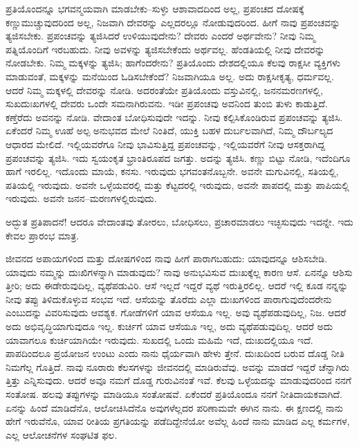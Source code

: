 ಪ್ರತಿಯೊಂದನ್ನೂ ಭಗವನ್ಮಯವಾಗಿ ಮಾಡಬೇಕು–ಸುಳ್ಳು ಆಶಾವಾದದಿಂದ ಅಲ್ಲ, ಪ್ರಪಂಚದ ದೋಷಕ್ಕೆ ಕಣ್ಣುಮುಚ್ಚುವುದರಿಂದ ಅಲ್ಲ, ನಿಜವಾಗಿ ದೇವರನ್ನು ಎಲ್ಲದರಲ್ಲೂ ನೋಡುವುದರಿಂದ. ಹೀಗೆ ನಾವು ಪ್ರಪಂಚವನ್ನು ತ್ಯಜಿಸಬೇಕು. ಪ್ರಪಂಚವನ್ನು ತ್ಯಜಿಸಿದರೆ ಉಳಿಯುವುದೇನು? ದೇವರು ಎಂದರೆ ಅರ್ಥವೇನು? ನೀವು ನಿಮ್ಮ ಪತ್ನಿಯೊಂದಿಗೆ ಇರಬಹುದು. ನೀವು ಅವಳನ್ನು ತ್ಯಜಿಸಬೇಕೆಂದು ಅರ್ಥವಲ್ಲ. ಹೆಂಡತಿಯಲ್ಲಿ ನೀವು ದೇವರನ್ನು ನೋಡಬೇಕು. ನಿಮ್ಮ ಮಕ್ಕಳನ್ನು ತ್ಯಜಿಸಿ; ಹಾಗೆಂದರೇನು? ಪ್ರತಿಯೊಂದು ದೇಶದಲ್ಲಿಯೂ ಕೆಲವು ರಾಕ್ಷಸೀ ವ್ಯಕ್ತಿಗಳು ಮಾಡುವಂತೆ, ಮಕ್ಕಳನ್ನು ಮನೆಯಿಂದ ಓಡಿಸಬೇಕೆಂದೆ? ನಿಜವಾಗಿಯೂ ಅಲ್ಲ. ಅದು ರಾಕ್ಷಸೀಕೃತ್ಯ, ಧರ್ಮವಲ್ಲ. ಆದರೆ ನಿಮ್ಮ ಮಕ್ಕಳಲ್ಲಿ ದೇವರನ್ನು ನೋಡಿ. ಅದರಂತೆಯೇ ಪ್ರತಿಯೊಂದು ವಸ್ತುವಿನಲ್ಲಿ, ಜನನಮರಣಗಳಲ್ಲಿ, ಸುಖದುಃಖಗಳಲ್ಲಿ ದೇವರು ಒಂದೇ ಸಮನಾಗಿರುವನು. ಇಡೀ ಪ್ರಪಂಚವು ಅವನಿಂದ ತುಂಬಿ ತುಳು ಕಾಡುತ್ತಿದೆ. ಕಣ್ತೆರೆದು ಅವನನ್ನು ನೋಡಿ. ವೇದಾಂತ ಬೋಧಿಸುವುದೇ ಇದನ್ನು. ನೀವು ಕಲ್ಪಿಸಿಕೊಂಡಿರುವ ಪ್ರಪಂಚವನ್ನು ತ್ಯಜಿಸಿ. ಏಕೆಂದರೆ ನಿಮ್ಮ ಊಹೆ ಅಲ್ಪ ಅನುಭವದ ಮೇಲೆ ನಿಂತಿದೆ, ಯುಕ್ತಿ ಬಹಳ ದುರ್ಬಲವಾಗಿದೆ, ನಿಮ್ಮ ದೌರ್ಬಲ್ಯದ ಆಧಾರದ ಮೇಲಿದೆ. ಇಲ್ಲಿಯವರೆಗೂ ನೀವು ಭಾವಿಸುತ್ತಿದ್ದ ಪ್ರಪಂಚವನ್ನು, ಇಲ್ಲಿಯವರೆಗೆ ನೀವು ಆಸಕ್ತರಾಗಿದ್ದ ಪ್ರಪಂಚವನ್ನು ತ್ಯಜಿಸಿ. ಇದು ಸ್ವಯಂಕೃತ ಭ್ರಾಂತಿರೂಪದ ಜಗತ್ತು. ಅದನ್ನು ತ್ಯಜಿಸಿ. ಕಣ್ಣು ಬಿಟ್ಟು ನೋಡಿ, ಇದೆಂದಿಗೂ ಹಾಗೆ ಇರಲಿಲ್ಲ. ಇದೊಂದು ಮಾಯೆ, ಕನಸು. ಇರುವುದು ಭಗವಂತನೊಬ್ಬನೇ. ಅವನೇ ಮಗುವಿನಲ್ಲಿ, ಸತಿಯಲ್ಲಿ, ಪತಿಯಲ್ಲಿ ಇರುವುದು. ಅವನೇ ಒಳ್ಳೆಯವರಲ್ಲಿ ಮತ್ತು ಕೆಟ್ಟದರಲ್ಲಿ ಇರುವುದು, ಅವನೇ ಪಾಪದಲ್ಲಿ ಮತ್ತು ಪಾಪಿಯಲ್ಲಿ ಇರುವುದು. ಅವನೇ ಜನನ–ಮರಣಗಳಲ್ಲಿರುವುದು.

ಅದ್ಭುತ ಪ್ರತಿಪಾದನೆ! ಆದರೂ ವೇದಾಂತವು ತೋರಲು, ಬೋಧಿಸಲು, ಪ್ರಚಾರಮಾಡಲು ಇಚ್ಛಿಸುವುದು ಇದನ್ನೇ. ಇದು ಕೇವಲ ಪ್ರಾರಂಭ ಮಾತ್ರ.

ಜೀವನದ ಅಪಾಯಗಳಿಂದ ಮತ್ತು ದೋಷಗಳಿಂದ ನಾವು ಹೀಗೆ ಪಾರಾಗಬಹುದು: ಯಾವುದನ್ನೂ ಆಶಿಸಬೇಡಿ. ಯಾವುದು ನಮ್ಮನ್ನು ದುಃಖಿಗಳನ್ನಾಗಿ ಮಾಡುವುದು? ನಾವು ಅನುಭವಿಸುವ ದುಃಖಕ್ಕೆಲ್ಲ ಕಾರಣ ಆಸೆ. ಏನನ್ನೊ ಆಶಿಸು ತ್ತೀರಿ; ಅದು ಈಡೇರುವುದಿಲ್ಲ, ವ್ಯಥೆಪಡುವಿರಿ. ಆಸೆ ಇಲ್ಲದೆ ಇದ್ದರೆ ವ್ಯಥೆ ಇರುತ್ತಿರಲಿಲ್ಲ. ಆದರೆ ಇಲ್ಲಿ ಕೂಡ ನನ್ನನ್ನು ನೀವು ತಪ್ಪು ತಿಳಿದುಕೊಳ್ಳುವ ಸಂಭವ ಇದೆ. ಆಸೆಯನ್ನು ತೊರೆದು ಎಲ್ಲಾ ದುಃಖಗಳಿಂದ ಪಾರಾಗುವುದೆಂದರೇನು ಎಂಬುದನ್ನು ವಿವರಿಸುವುದು ಆವಶ್ಯಕ. ಗೋಡೆಗಳಿಗೆ ಯಾವ ಆಸೆಯೂ ಇಲ್ಲ. ಅವು ವ್ಯಥೆಪಡುವುದಿಲ್ಲ, ನಿಜ. ಆದರೆ ಅದು ಅಭಿವೃದ್ಧಿಯಾಗುವುದೂ ಇಲ್ಲ. ಕುರ್ಚಿಗೆ ಯಾವ ಆಸೆಯೂ ಇಲ್ಲ, ಅದು ವ್ಯಥೆಪಡುವುದಿಲ್ಲ. ಆದರೆ ಅದು ಯಾವಾಗಲೂ ಕುರ್ಚಿಯಾಗಿಯೇ ಇರುವುದು. ಸುಖದಲ್ಲಿ ಒಂದು ಮಹಿಮೆ ಇದೆ, ದುಃಖದಲ್ಲಿಯೂ ಇದೆ. ಪಾಪದಿಂದಲೂ ಪ್ರಯೋಜನ ಉಂಟು ಎಂದು ನಾನು ಧೈರ್ಯವಾಗಿ ಹೇಳು ತ್ತೇನೆ. ದುಃಖದಿಂದ ಬರುವ ದೊಡ್ಡ ನೀತಿ ನಿಮಗೆಲ್ಲ ಗೊತ್ತಿದೆ. ನಾವು ನೂರಾರು ಕೆಲಸಗಳನ್ನು ಜೀವನದಲ್ಲಿ ಮಾಡಿರುವೆವು. ಅವನ್ನು ಮಾಡದೆ ಇದ್ದರೆ ಚೆನ್ನಾಗಿರು ತ್ತಿತ್ತು ಎನ್ನಿಸುವುದು. ಆದರೆ ಅವೂ ನಮಗೆ ದೊಡ್ಡ ಗುರುವಿನಂತೆ ಇವೆ. ಕೆಲವು ಒಳ್ಳೆಯದನ್ನು ಮಾಡುವುದರಿಂದ ನನಗೆ ಸಂತೋಷ. ಹಲವು ತಪ್ಪುಗಳನ್ನು ಮಾಡಿಯೂ ಸಂತೋಷವೆ. ಏಕೆಂದರೆ ಪ್ರತಿಯೊಂದೂ ನನಗೆ ನೀತಿದಾಯಕವಾಗಿದೆ. ಏನನ್ನು ಹಿಂದೆ ಮಾಡಿದೆನೊ, ಆಲೋಚಿಸಿದೆನೊ ಅವುಗಳೆಲ್ಲದರ ಪರಿಣಾಮವೇ ಈಗಿನ ನಾನು. ಈ ಕ್ಷಣದಲ್ಲಿ ನಾನು ಹೇಗೆ ಇರುವೆನೊ, ಯಾವ ರೀತಿಯ ಪ್ರಗತಿಯನ್ನು ಪಡೆದಿದ್ದೇನೆಯೋ ಅವೆಲ್ಲ ಹಿಂದೆ ನಾನು ಮಾಡಿದ ಎಲ್ಲ ಕರ್ಮಗಳ, ಎಲ್ಲ ಆಲೋಚನೆಗಳ ಸಂಘಟಿತ ಫಲ.

